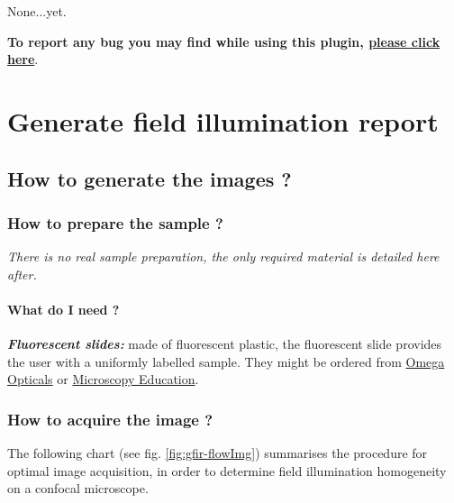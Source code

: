 \documentclass[a4paper, 11pt]{report}%
\makeatletter
\newcommand{\mailbug}{\begin{center}\textbf{To report any bug you may find while using this plugin, \href{mailto:fabrice.cordelieres@gmail.com,cedric.matthews@ibdml.univ-mrs.fr ?subject=Bug\%20found\%20in\%20MetroloJ&body=\%0ABug\%20description:\%0A\%0AHow\%20did\%20it\%20happen:\%0A\%0ACopy/Paste\%20the\%20content\%20of\%20the\%20log\%20window\%0A\%0AVersion\%20of\%20ImageJ:\%0A\%0AVersion\%20of\%20Java:}{please click here}}.\end{center}}
\makeatother
\begin{document}
None...yet.

\mailbug

\chapter{Generate field illumination report}
\label{chap:gfir}

\section{How to generate the images ?}
\label{sec:gfir-what}

\subsection{How to prepare the sample ?}
\label{sec:gfir-proto}

\textit{There is no real sample preparation, the only required material is detailed here after.}

\subsubsection{What do I need ?}
\label{sec:gfir-proto-what}

\begin{itemize*}
	\item \textbf{\textit{Fluorescent slides:}} made of fluorescent plastic, the fluorescent slide provides the user with a uniformly labelled sample. They might be ordered from \href{https://www.omegafilters.com/index.php?page=prod_rslides_pro}{Omega Opticals} or \href{http://www.microscopyeducation.com/fluorrefslides.html}{Microscopy Education}.
\end{itemize*}

\subsection{How to acquire the image ?}
\label{sec:gfir-flow}

The following chart (see fig. \ref{fig:gfir-flowImg}) summarises the procedure for optimal image acquisition, in order to determine field illumination homogeneity on a confocal microscope.
\end{document}
